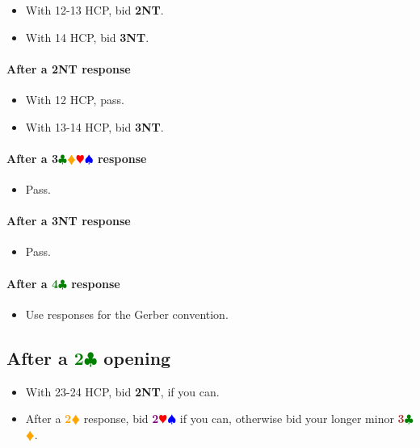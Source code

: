 \documentclass{article}
\newcommand{\Hs}{\textcolor{Red}{$\varheart$}}
\newcommand{\Ss}{\textcolor{Blue}{$\spadesuit$}}
\newcommand{\Ds}{\textcolor{Orange}{$\vardiamond$}}
\newcommand{\Cs}{\textcolor{Green}{$\clubsuit$}}
\newcommand{\NTs}{\textbf{\footnotesize{NT}}}
\newcommand{\D}[1]{\textcolor{Orange}{\textbf{#1}\Ds}}
\newcommand{\C}[1]{\textcolor{Green}{\textbf{#1}\Cs}}
\newcommand{\NT}[1]{\textbf{#1\NTs}}
\newcommand{\suits}[1]{\textbf{#1}\Cs\Ds\Hs\Ss}
\newcommand{\minors}[1]{\textcolor{Brown}{\textbf{#1}}\Cs\Ds}
\newcommand{\majors}[1]{\textcolor{Purple}{\textbf{#1}}\Hs\Ss}
\begin{document}
\begin{itemize}
\item With 12-13 HCP, bid \NT{2}.
\item With 14 HCP, bid \NT{3}.
\end{itemize}

\paragraph{After a \NT{2} response}

\begin{itemize}
\item With 12 HCP, pass.
\item With 13-14 HCP, bid \NT{3}.
\end{itemize}

\paragraph{After a \suits{3} response}

\begin{itemize}
\item Pass.
\end{itemize}

\paragraph{After a \NT{3} response}

\begin{itemize}
\item Pass.
\end{itemize}

\paragraph{After a \C{4} response} 

\begin{itemize}
\item Use responses for the Gerber convention.
\end{itemize}

\subsection{After a \C{2} opening}

\begin{itemize}
\item With 23-24 HCP, bid \NT{2}, if you can.
\item After a \D{2} response, bid \majors{2} if you can, otherwise bid your longer minor \minors{3}.
\end{itemize}
\end{document}
